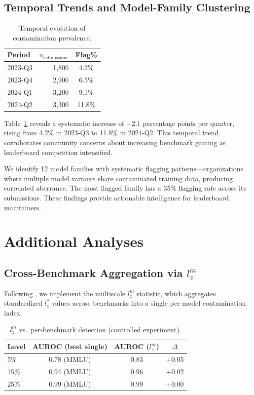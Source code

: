 \documentclass[11pt,a4paper]{article}
\begin{document}
\subsection{Temporal Trends and Model-Family Clustering}

\begin{table}[t]
\centering
\caption{Temporal evolution of contamination prevalence.}
\label{tab:temporal}
\begin{tabular}{lrc}
\toprule
Period & $n_{\text{submissions}}$ & Flag\% \\
\midrule
2023-Q3 & 1,800 & 4.2\% \\
2023-Q4 & 2,900 & 6.5\% \\
2024-Q1 & 3,200 & 9.1\% \\
2024-Q2 & 3,300 & 11.8\% \\
\bottomrule
\end{tabular}
\end{table}

Table~\ref{tab:temporal} reveals a systematic increase of +2.1 percentage points per quarter, rising from 4.2\% in 2023-Q3 to 11.8\% in 2024-Q2.
This temporal trend corroborates community concerns about increasing benchmark gaming as leaderboard competition intensified.

We identify 12 model families with systematic flagging patterns---organizations where multiple model variants share contaminated training data, producing correlated aberrance.
The most flagged family has a 35\% flagging rate across its submissions.
These findings provide actionable intelligence for leaderboard maintainers.

\section{Additional Analyses}

\subsection{Cross-Benchmark Aggregation via $l_{z}^{m}$}

Following \citet{hong2021multiscale}, we implement the multiscale $l_{z}^{m}$ statistic, which aggregates standardized $l_{z}^{*}$ values across benchmarks into a single per-model contamination index.

\begin{table}[t]
\centering
\caption{$l_{z}^{m}$ vs.\ per-benchmark detection (controlled experiment).}
\label{tab:lzm}
\begin{tabular}{lccc}
\toprule
Level & AUROC (best single) & AUROC ($l_{z}^{m}$) & $\Delta$ \\
\midrule
5\% & 0.78 (MMLU) & 0.83 & +0.05 \\
15\% & 0.94 (MMLU) & 0.96 & +0.02 \\
25\% & 0.99 (MMLU) & 0.99 & +0.00 \\
\bottomrule
\end{tabular}
\end{table}
\end{document}
